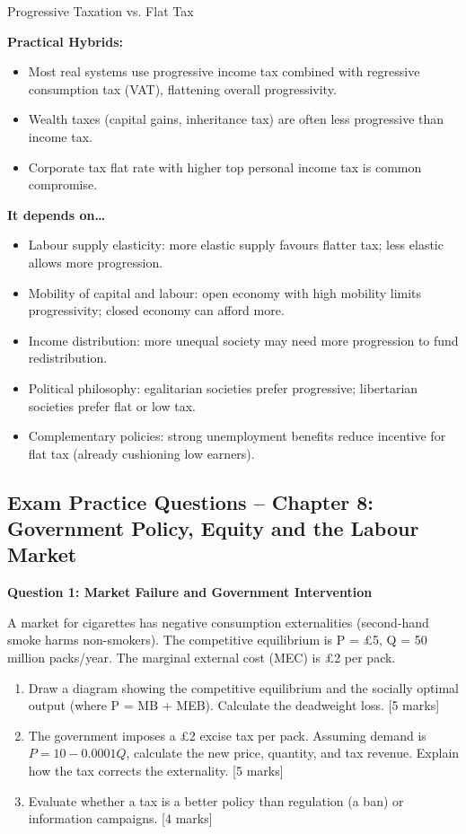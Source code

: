 \documentclass[11pt, a4paper, twoside]{book}
\begin{document}
\begin{evaluation}{Progressive Taxation vs. Flat Tax}
\begin{itemize}[leftmargin=*, nosep]
\end{itemize}
\textbf{Practical Hybrids:}
\begin{itemize}[leftmargin=*, nosep]
\item Most real systems use progressive income tax combined with regressive consumption tax (VAT), flattening overall progressivity.
\item Wealth taxes (capital gains, inheritance tax) are often less progressive than income tax.
\item Corporate tax flat rate with higher top personal income tax is common compromise.
\end{itemize}
\textbf{It depends on\ldots}
\begin{itemize}[leftmargin=*, nosep]
\item Labour supply elasticity: more elastic supply favours flatter tax; less elastic allows more progression.
\item Mobility of capital and labour: open economy with high mobility limits progressivity; closed economy can afford more.
\item Income distribution: more unequal society may need more progression to fund redistribution.
\item Political philosophy: egalitarian societies prefer progressive; libertarian societies prefer flat or low tax.
\item Complementary policies: strong unemployment benefits reduce incentive for flat tax (already cushioning low earners).
\end{itemize}
\end{evaluation}

\subsection{Exam Practice Questions -- Chapter 8: Government Policy, Equity and the Labour Market}

\begin{exampractice}
\textbf{Question 1: Market Failure and Government Intervention}

A market for cigarettes has negative consumption externalities (second-hand smoke harms non-smokers). The competitive equilibrium is P = £5, Q = 50 million packs/year. The marginal external cost (MEC) is £2 per pack.

\begin{enumerate}[label=(\alph*)]
\item Draw a diagram showing the competitive equilibrium and the socially optimal output (where P = MB + MEB). Calculate the deadweight loss. [5 marks]
\item The government imposes a £2 excise tax per pack. Assuming demand is $P = 10 - 0.0001Q$, calculate the new price, quantity, and tax revenue. Explain how the tax corrects the externality. [5 marks]
\item Evaluate whether a tax is a better policy than regulation (a ban) or information campaigns. [4 marks]
\end{enumerate}
\end{exampractice}
\end{document}
